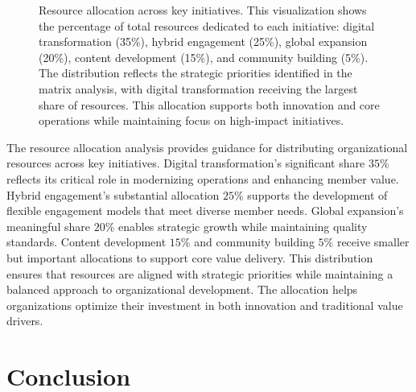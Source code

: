 \documentclass[conference]{IEEEtran}
\begin{document}
\begin{figure}[t]
\centering
{}
\caption{Resource allocation across key initiatives. 
This visualization shows the percentage of total resources dedicated to each initiative: 
digital transformation (35\%), hybrid engagement (25\%), global expansion (20\%), 
content development (15\%), and community building (5\%). The distribution reflects 
the strategic priorities identified in the matrix analysis, with digital transformation 
receiving the largest share of resources. This allocation supports both innovation 
and core operations while maintaining focus on high-impact initiatives.}
\label{fig:resource_allocation}
\end{figure}

The resource allocation analysis provides guidance for distributing organizational resources across key initiatives. Digital transformation's significant share \(35\%\) reflects its critical role in modernizing operations and enhancing member value. Hybrid engagement's substantial allocation \(25\%\) supports the development of flexible engagement models that meet diverse member needs. Global expansion's meaningful share \(20\%\) enables strategic growth while maintaining quality standards. Content development \(15\%\) and community building \(5\%\) receive smaller but important allocations to support core value delivery. This distribution ensures that resources are aligned with strategic priorities while maintaining a balanced approach to organizational development. The allocation helps organizations optimize their investment in both innovation and traditional value drivers.

\section{Conclusion}
\end{document}

